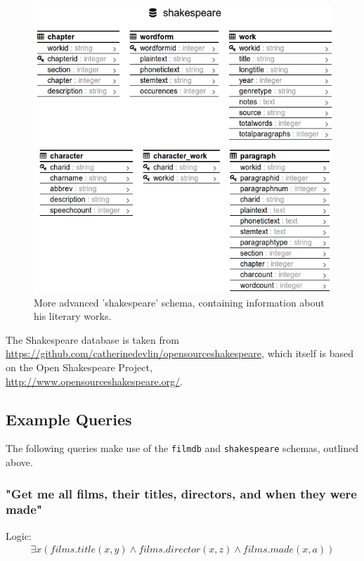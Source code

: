 \documentclass[a4paper, 11pt]{article}
\begin{document}
      \begin{figure}[H]
        \includegraphics[width=\textwidth]{images/site_schema_shakespeare.png}
        \caption{More advanced 'shakespeare' schema, containing information
        about his literary works.}
      \end{figure}

      The Shakespeare database is taken from \\
      \url{https://github.com/catherinedevlin/opensourceshakespeare}, which
      itself is based on the Open Shakespeare Project, \\
      \url{http://www.opensourceshakespeare.org/}.

  \subsection{Example Queries}

  The following queries make use of the \texttt{filmdb} and
  \texttt{shakespeare} schemas, outlined above.

    \subsubsection*{"Get me all films, their titles, directors, and when they
      were made"}

      Logic:
      \begin{gather}
        \exists x(films.title(x, y) \land films.director(x, z) \land films.made(x, a))
      \end{gather}
\end{document}
